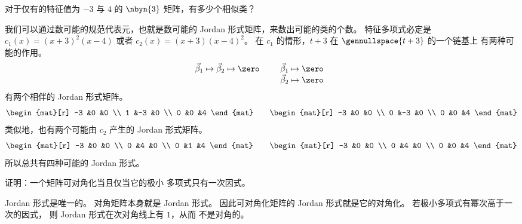   \item 
    对于仅有的特征值为 \( -3 \) 与 \( 4 \) 的
    \( \nbyn{3} \) 矩阵，有多少个相似类？
    \begin{answer}
     我们可以通过数可能的规范代表元，也就是数可能的
     Jordan 形式矩阵，来数出可能的类的个数。
     特征多项式必定是 $c_1(x)=(x+3)^2(x-4)$
     或者 $c_2(x)=(x+3)(x-4)^2$。
     在 $c_1$ 的情形，$t+3$ 在 $\gennullspace{t+3}$ 的一个链基上
     有两种可能的作用。
     \begin{equation*}
       \vec{\beta}_1\mapsto\vec{\beta}_2\mapsto \zero
       \qquad
       \begin{array}[t]{l}
         \vec{\beta}_1\mapsto\zero \\
         \vec{\beta}_2\mapsto\zero 
       \end{array}
     \end{equation*}
     有两个相伴的 Jordan 形式矩阵。
     \begin{equation*}
        \begin{mat}[r]
          -3  &0  &0  \\
           1  &-3 &0  \\
           0  &0  &4
        \end{mat}
        \qquad
        \begin{mat}[r]
          -3  &0  &0  \\
           0  &-3 &0  \\
           0  &0  &4
        \end{mat}
      \end{equation*}
      类似地，也有两个可能由 $c_2$ 产生的
      Jordan 形式矩阵。
      \begin{equation*}
        \begin{mat}[r]
          -3  &0  &0  \\
           0  &4  &0  \\
           0  &1  &4
        \end{mat}
        \qquad
        \begin{mat}[r]
          -3  &0  &0  \\
           0  &4  &0  \\
           0  &0  &4
        \end{mat}
     \end{equation*}  
     所以总共有四种可能的 Jordan 形式。
    \end{answer}
  \recommended \item
    证明：一个矩阵可对角化当且仅当它的极小
    多项式只有一次因式。
    \begin{answer}
       Jordan 形式是唯一的。
       对角矩阵本身就是 Jordan 形式。
       因此可对角化矩阵的 Jordan 形式就是它的对角化。
       若极小多项式有幂次高于一次的因式，
       则 Jordan 形式在次对角线上有 \( 1 \)，从而
       不是对角的。  
     \end{answer}
